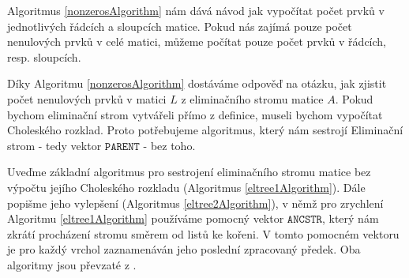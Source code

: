 \documentclass[11pt,american,czech,oneside]{book}
\theoremstyle{plain}
\theoremstyle{definition}
\begin{document}
\begin{figure}[ht]
  \centering
  \begin{minipage}{.5\linewidth}
    \begin{algorithm}[H]
      \SetAlgoNoLine
      

    \end{algorithm}
  \end{minipage}
\end{figure}

Algoritmus \ref{nonzerosAlgorithm} nám dává návod jak vypočítat počet prvků v jednotlivých řádcích a sloupcích matice. Pokud nás zajímá pouze počet nenulových prvků v celé matici, můžeme počítat pouze počet prvků v řádcích, resp. sloupcích.

Díky Algoritmu \ref{nonzerosAlgorithm} dostáváme odpověď na otázku, jak zjistit počet nenulových prvků v matici $L$ z eliminačního stromu matice $A$. Pokud bychom eliminační strom vytvářeli přímo z definice, museli bychom vypočítat Choleského rozklad. Proto potřebujeme algoritmus, který nám sestrojí Eliminační strom - tedy vektor $\texttt{PARENT}$ - bez toho.

Uveďme základní algoritmus pro sestrojení eliminačního stromu matice bez výpočtu jejího Choleského rozkladu (Algoritmus \ref{eltree1Algorithm}). Dále popišme jeho vylepšení (Algoritmus \ref{eltree2Algorithm}), v němž pro zrychlení Algoritmu \ref{eltree1Algorithm} používáme pomocný vektor $\texttt{ANCSTR}$, který nám zkrátí procházení stromu směrem od listů ke kořeni. V tomto pomocném vektoru je pro každý vrchol zaznamenáván jeho poslední zpracovaný předek. Oba algoritmy jsou převzaté z \cite{liu:86}. 
\end{document}
